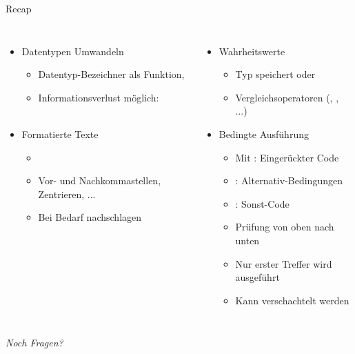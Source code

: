 
\begin{frame}[t,plain]
\titlepage
\end{frame}


\begin{frame}{Recap}
%
\begin{columns}[T]
\begin{itemize}
\item Datentypen Umwandeln
	\begin{itemize}
	\item Datentyp-Bezeichner als Funktion, \zB {}
	\item Informationsverlust möglich: \\
		 ~\thus~ 
	\end{itemize}
\item Formatierte Texte
	\begin{itemize}
	\item {}
	\item Vor- und Nachkommastellen, Zentrieren, ...
	\item Bei Bedarf nachschlagen
	\end{itemize}
\end{itemize}
%
\begin{itemize}
\item Wahrheitswerte
	\begin{itemize}
	\item Typ  speichert  oder 
	\item Vergleichsoperatoren (\inPy{==}, \inPy{>=}, ...)
	\end{itemize}
\item Bedingte Ausführung
	\begin{itemize}
	\item Mit : Eingerückter Code
	\item {}: Alternativ-Bedingungen
	\item {}: Sonst-Code
	\item Prüfung von oben nach unten
	\item Nur erster Treffer wird ausgeführt
	\item Kann verschachtelt werden
	\end{itemize}
\end{itemize}
\end{columns}
%
\begin{center}
	\emph{Noch Fragen?}
\end{center}
%
\end{frame}

